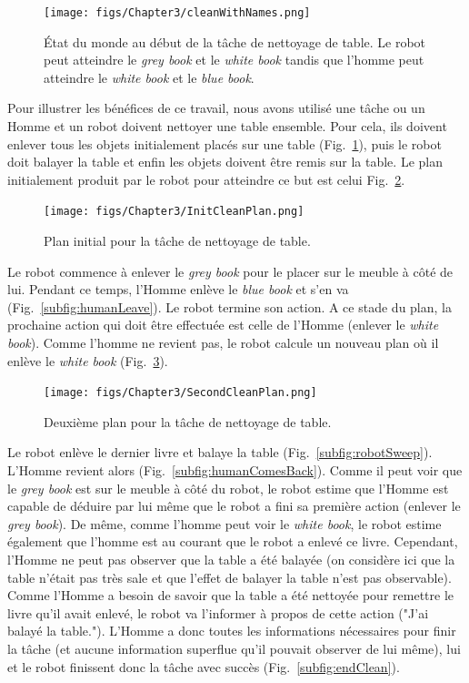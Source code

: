 \documentclass[english,a4paper,11pt,twoside]{StyleThese}
\begin{document}
\begin{figure}[!h]
	\centering
    \texttt{[image: figs/Chapter3/cleanWithNames.png]}
    \caption{État du monde au début de la tâche de nettoyage de table. Le robot peut atteindre le \textit{grey book} et le \textit{white book} tandis que l'homme peut atteindre le \textit{white book} et le \textit{blue book}.}
    \label{fig:initClean}
\end{figure}


Pour illustrer les bénéfices de ce travail, nous avons utilisé une tâche ou un Homme et un robot doivent nettoyer une table ensemble. Pour cela, ils doivent enlever tous les objets initialement placés sur une table (Fig.~\ref{fig:initClean}), puis le robot doit balayer la table et enfin les objets doivent être remis sur la table. Le plan initialement produit par le robot pour atteindre ce but est celui Fig.~\ref{fig:initPlanClean}.

\begin{figure}[!h]
	\centering
    \texttt{[image: figs/Chapter3/InitCleanPlan.png]}
    \caption{Plan initial pour la tâche de nettoyage de table.}
    \label{fig:initPlanClean}
\end{figure}

Le robot commence à enlever le \textit{grey book} pour le placer sur le meuble à côté de lui. Pendant ce temps, l'Homme enlève le \textit{blue book} et s'en va (Fig.~\ref{subfig:humanLeave}). Le robot termine son action. A ce stade du plan, la prochaine action qui doit être effectuée est celle de l'Homme (enlever le \textit{white book}). Comme l'homme ne revient pas, le robot calcule un nouveau plan où il enlève le \textit{white book} (Fig.~\ref{fig:newplan}).

\begin{figure}[!h]
	\centering
    \texttt{[image: figs/Chapter3/SecondCleanPlan.png]}
    \caption{Deuxième plan pour la tâche de nettoyage de table.}
    \label{fig:newplan}
\end{figure}

Le robot enlève le dernier livre et balaye la table (Fig.~\ref{subfig:robotSweep}). L'Homme revient alors (Fig.~\ref{subfig:humanComesBack}). Comme il peut voir que le \textit{grey book} est sur le meuble à côté du robot, le robot estime que l'Homme est capable de déduire par lui même que le robot a fini sa première action (enlever le \textit{grey book}). De même, comme l'homme peut voir le \textit{white book}, le robot estime également que l'homme est au courant que le robot a enlevé ce livre. Cependant, l'Homme ne peut pas observer que la table a été balayée (on considère ici que la table n'était pas très sale et que l'effet de balayer la table n'est pas observable). Comme l'Homme a besoin de savoir que la table a été nettoyée pour remettre le livre qu'il avait enlevé, le robot va l'informer à propos de cette action ("J'ai balayé la table."). L'Homme a donc toutes les informations nécessaires pour finir la tâche (et aucune information superflue qu'il pouvait observer de lui même), lui et le robot finissent donc la tâche avec succès (Fig.~\ref{subfig:endClean}).
\end{document}
